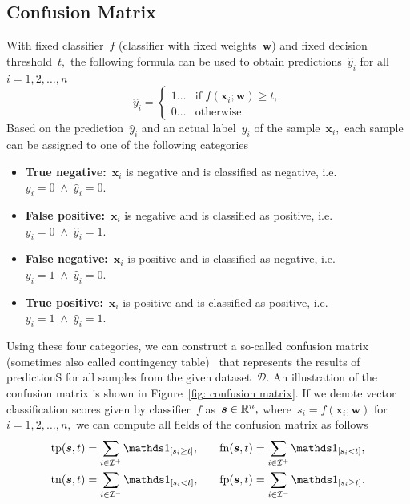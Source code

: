 \subsection{Confusion Matrix}
With fixed classifier~$f$ (classifier with fixed weights~$\bm{w}$) and fixed decision threshold~$t,$ the following formula can be used to obtain predictions~$\hat{y}_i$ for all~$i = 1, 2, \ldots, n$
\begin{equation*}
  \hat{y}_i = \begin{cases}
    1 \ldots & \text{if } f(\bm{x}_i; \bm{w}) \ge t, \\
    0 \ldots & \text{otherwise.}
  \end{cases}
\end{equation*}
Based on the prediction~$\hat{y}_i$ and an actual label~$y_i$ of the sample~$\bm{x}_i,$ each sample can be assigned to one of the following categories
\begin{itemize}
  \item \textbf{True negative:}~$\bm{x}_i$ is negative and is classified as negative, i.e.~$y_i = 0 \; \land \; \hat{y}_i = 0.$
  \item \textbf{False positive:}~$\bm{x}_i$ is negative and is classified as positive, i.e.~$y_i = 0 \; \land \; \hat{y}_i = 1.$
  \item \textbf{False negative:}~$\bm{x}_i$ is positive and is classified as negative, i.e.~$y_i = 1 \; \land \; \hat{y}_i = 0.$
  \item \textbf{True positive:}~$\bm{x}_i$ is positive and is classified as positive, i.e.~$y_i = 1 \; \land \; \hat{y}_i = 1.$
\end{itemize}
Using these four categories, we can construct a so-called confusion matrix (sometimes also called contingency table)~\cite{fawcett2006introduction} that represents the results of predictionS for all samples from the given dataset~$\mathcal{D}$. An illustration of the confusion matrix is shown in Figure~\ref{fig: confusion matrix}. If we denote vector classification scores given by classifier~$f$ as~$\bm{s} \in \mathbb{R}^n,$ where~$s_i = f(\bm{x}_i; \bm{w})$ for~$i = 1, 2, \ldots, n,$ we can compute all fields of the confusion matrix as follows
\begin{equation}\label{eq: confusion counts}
  \begin{aligned}
    \tp(\bm{s}, t) & = \sum_{i \in \I^+}\Iverson{s_i \ge t}, & \quad
    \fn(\bm{s}, t) & = \sum_{i \in \I^+}\Iverson{s_i < t}, \\
    \tn(\bm{s}, t) & = \sum_{i \in \I^-}\Iverson{s_i < t}, & \quad
    \fp(\bm{s}, t) & = \sum_{i \in \I^-}\Iverson{s_i \ge t}.
  \end{aligned}
\end{equation}
